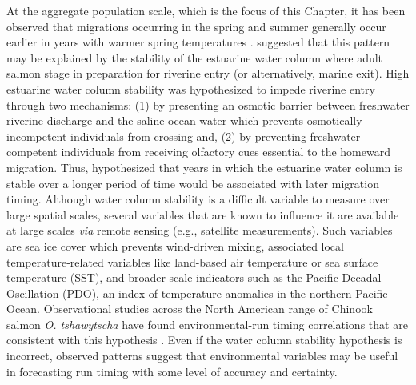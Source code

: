\documentclass[12pt,]{book}
\theoremstyle{definition}
\theoremstyle{definition}
\theoremstyle{definition}
\theoremstyle{remark}
\begin{document}
At the aggregate population scale, which is the focus of this Chapter,
it has been observed that migrations occurring in the spring and summer
generally occur earlier in years with warmer spring temperatures
\citep{mundy-evenson-2011, hodgson-etal-2006}.
\citet{mundy-evenson-2011} suggested that this pattern may be explained
by the stability of the estuarine water column where adult salmon stage
in preparation for riverine entry (or alternatively, marine exit). High
estuarine water column stability was hypothesized to impede riverine
entry through two mechanisms: (1) by presenting an osmotic barrier
between freshwater riverine discharge and the saline ocean water which
prevents osmotically incompetent individuals from crossing and, (2) by
preventing freshwater-competent individuals from receiving olfactory
cues essential to the homeward migration. Thus,
\citet{mundy-evenson-2011} hypothesized that years in which the
estuarine water column is stable over a longer period of time would be
associated with later migration timing. Although water column stability
is a difficult variable to measure over large spatial scales, several
variables that are known to influence it are available at large scales
\emph{via} remote sensing (e.g., satellite measurements). Such variables
are sea ice cover which prevents wind-driven mixing, associated local
temperature-related variables like land-based air temperature or sea
surface temperature (SST), and broader scale indicators such as the
Pacific Decadal Oscillation (PDO), an index of temperature anomalies in
the northern Pacific Ocean. Observational studies across the North
American range of Chinook salmon \emph{O. tshawytscha} have found
environmental-run timing correlations that are consistent with this
hypothesis
\citep{hodgson-etal-2006, keefer-etal-2008, mundy-evenson-2011}. Even if
the water column stability hypothesis is incorrect, observed patterns
suggest that environmental variables may be useful in forecasting run
timing with some level of accuracy and certainty.
\end{document}
